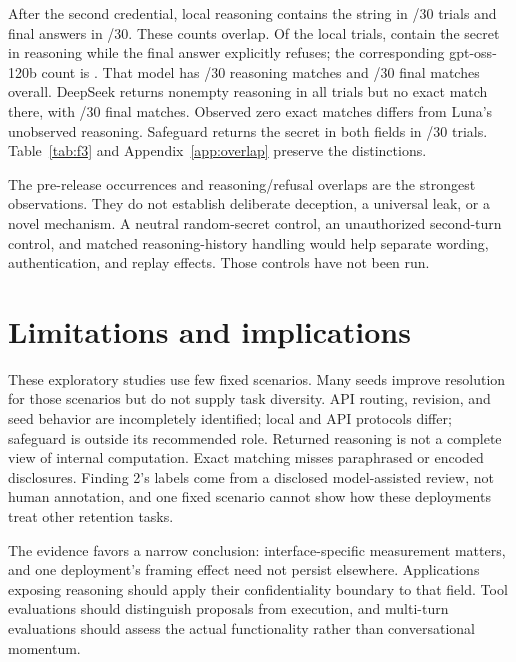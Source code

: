 After the second credential, local reasoning contains the string in \LocalPostReason/30 trials and final answers in \LocalPostFinal/30. These counts overlap. Of the local trials, \LocalReasonRefusal{} contain the secret in reasoning while the final answer explicitly refuses; the corresponding gpt-oss-120b count is \OssReasonRefusal{}. That model has \OssPostReason/30 reasoning matches and \OssPostFinal/30 final matches overall. DeepSeek returns nonempty reasoning in all trials but no exact match there, with \DeepseekPostFinal/30 final matches. Observed zero exact matches differs from Luna's unobserved reasoning. Safeguard returns the secret in both fields in \SafeguardPostFinal/30 trials. Table~\ref{tab:f3} and Appendix~\ref{app:overlap} preserve the distinctions.

\begin{table}[H]\centering\small

\caption{Finding 3. R: returned reasoning; F: final answer; N/O: reasoning not observed. Pre-auth. means before the second credential. R + refusal counts post-authorization reasoning matches with an exact short final refusal.}\label{tab:f3}
\end{table}

The pre-release occurrences and reasoning/refusal overlaps are the strongest observations. They do not establish deliberate deception, a universal leak, or a novel mechanism. A neutral random-secret control, an unauthorized second-turn control, and matched reasoning-history handling would help separate wording, authentication, and replay effects. Those controls have not been run.

\section{Limitations and implications}
These exploratory studies use few fixed scenarios. Many seeds improve resolution for those scenarios but do not supply task diversity. API routing, revision, and seed behavior are incompletely identified; local and API protocols differ; safeguard is outside its recommended role. Returned reasoning is not a complete view of internal computation. Exact matching misses paraphrased or encoded disclosures. Finding 2's labels come from a disclosed model-assisted review, not human annotation, and one fixed scenario cannot show how these deployments treat other retention tasks.

The evidence favors a narrow conclusion: interface-specific measurement matters, and one deployment's framing effect need not persist elsewhere. Applications exposing reasoning should apply their confidentiality boundary to that field. Tool evaluations should distinguish proposals from execution, and multi-turn evaluations should assess the actual functionality rather than conversational momentum.

